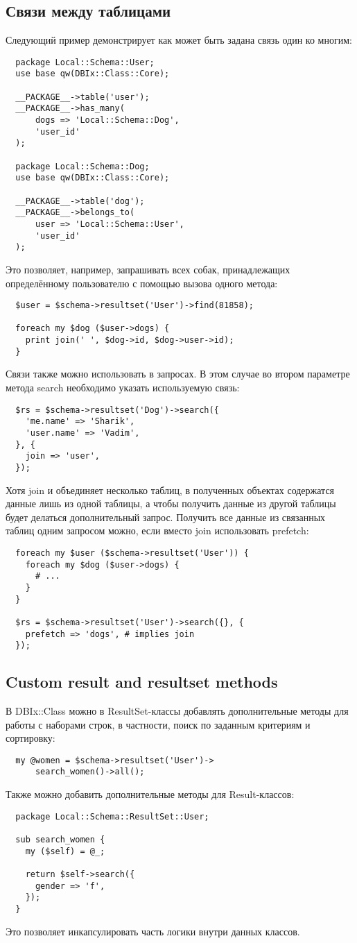 \subsection{Связи между таблицами}
Следующий пример демонстрирует как может быть задана связь один ко многим:
\begin{verbatim}
  package Local::Schema::User;
  use base qw(DBIx::Class::Core);

  __PACKAGE__->table('user');
  __PACKAGE__->has_many(
      dogs => 'Local::Schema::Dog',
      'user_id'
  );

  package Local::Schema::Dog;
  use base qw(DBIx::Class::Core);

  __PACKAGE__->table('dog');
  __PACKAGE__->belongs_to(
      user => 'Local::Schema::User',
      'user_id'
  );
\end{verbatim}
Это позволяет, например, запрашивать всех собак, принадлежащих определённому пользователю с помощью вызова одного метода:
\begin{verbatim}
  $user = $schema->resultset('User')->find(81858);

  foreach my $dog ($user->dogs) {
    print join(' ', $dog->id, $dog->user->id);
  }
\end{verbatim}
Связи также можно использовать в запросах. В этом случае во втором параметре метода search необходимо указать используемую связь:
\begin{verbatim}
  $rs = $schema->resultset('Dog')->search({
    'me.name' => 'Sharik',
    'user.name' => 'Vadim',
  }, {
    join => 'user',
  });
\end{verbatim}
Хотя join и объединяет несколько таблиц, в полученных объектах содержатся данные лишь из одной таблицы, а чтобы получить данные из другой таблицы будет делаться дополнительный запрос. Получить все данные из связанных таблиц одним запросом можно, если вместо join использовать prefetch:
\begin{verbatim}
  foreach my $user ($schema->resultset('User')) {
    foreach my $dog ($user->dogs) {
      # ...
    }
  }

  $rs = $schema->resultset('User')->search({}, {
    prefetch => 'dogs', # implies join
  });
\end{verbatim}

\subsection{Custom result and resultset methods}
В DBIx::Class можно в ResultSet-классы добавлять дополнительные методы для работы с наборами строк, в частности, поиск по заданным критериям и сортировку:
\begin{verbatim}
  my @women = $schema->resultset('User')->
      search_women()->all();
\end{verbatim}
Также можно добавить дополнительные методы для Result-классов:
\begin{verbatim}
  package Local::Schema::ResultSet::User;

  sub search_women {
    my ($self) = @_;

    return $self->search({
      gender => 'f',
    });
  }
\end{verbatim}
Это позволяет инкапсулировать часть логики внутри данных классов.

